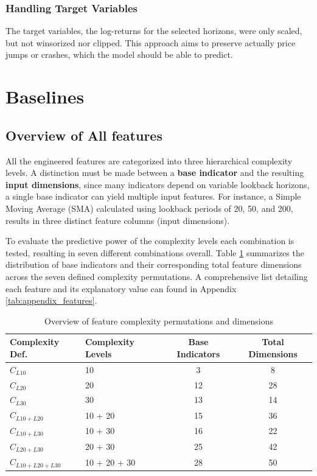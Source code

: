 \documentclass[12pt,twoside=false,a4paper,parskip]{scrbook}
\begin{document}
\subsubsection{Handling Target Variables}
The target variables, the log-returns for the selected horizons, were only scaled, but not winsorized nor clipped. This approach aims to preserve actually price jumps or crashes, which the model should be able to predict. 


\section{Baselines}

\subsection{Overview of All features}

All the engineered features are categorized into three hierarchical complexity levels. A distinction must be made between a \textbf{base indicator}  and the resulting \textbf{input dimensions}, since many indicators depend on variable lookback horizons, a single base indicator can yield multiple input features. For instance, a Simple Moving Average (SMA) calculated using lookback periods of 20, 50, and 200, results in three distinct feature columns (input dimensions). 

To evaluate the predictive power of the complexity levels each combination is tested, resulting in seven different combinations overall. 
Table \ref{tab:feature_distribution} summarizes the distribution of base indicators and their corresponding total feature dimensions across the seven defined complexity permutations. 
A comprehensive list detailing each feature and its explanatory value can found in Appendix \ref{tab:appendix_features}. 

\begin{table}[htbp]
\centering
\caption{Overview of feature complexity permutations and dimensions}
\label{tab:feature_distribution}
\begin{tabular}{llcc}
\toprule
\textbf{Complexity Def.} & \textbf{Complexity Levels} & \textbf{ Base Indicators} & \textbf{Total Dimensions} \\
\midrule
$C_{L10}$ & 10 & 3 & 8 \\
$C_{L20}$ & 20 & 12 & 28 \\
$C_{L30}$ & 30 & 13 & 14 \\
\midrule
$C_{L10+L20}$ & 10 + 20 & 15 & 36 \\
$C_{L10+L30}$ & 10 + 30 & 16 & 22 \\
$C_{L20+L30}$ & 20 + 30 & 25 & 42 \\
$C_{L10+L20+L30}$ & 10 + 20 + 30 & 28 & 50 \\
\bottomrule
\end{tabular}
\end{table}
\end{document}
